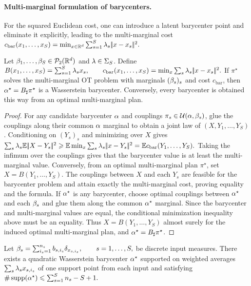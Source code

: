\paragraph{Multi-marginal formulation of barycenters.}
For the squared Euclidean cost, one can introduce a latent barycenter point and eliminate it explicitly, leading to the multi-marginal cost
\(c_{\mathrm{bar}}(x_1,\ldots,x_S) = \min_{x\in\mathbb{R}^d} \sum_{s=1}^S\lambda_s|\!| x-x_s |\!|^2.\)
\begin{prop}\label{prop-multimarginal-barycenter}
Let $\beta_1,\ldots,\beta_S\in\mathcal{P}_2(\mathbb{R}^d)$ and $\lambda\in\Sigma_S$. Define
\(B(x_1,\ldots,x_S)=\sum_{s=1}^S\lambda_s x_s, \qquad c_{\mathrm{bar}}(x_1,\ldots,x_S)=\min_x\sum_s\lambda_s|\!| x-x_s |\!|^2.\)
If $\pi^\star$ solves the multi-marginal OT problem with marginals $(\beta_s)_s$ and cost $c_{\mathrm{bar}}$, then $\alpha^\star=B_\sharp\pi^\star$ is a Wasserstein barycenter. Conversely, every barycenter is obtained this way from an optimal multi-marginal plan.
\end{prop}
\begin{proof}
For any candidate barycenter $\alpha$ and couplings $\pi_s\in\mathcal{U}(\alpha,\beta_s)$, glue the couplings along their common $\alpha$ marginal to obtain a joint law of $(X,Y_1,\ldots,Y_S)$. Conditioning on $(Y_s)_s$ and minimizing over $X$ gives
\(\sum_s\lambda_s\mathbb{E}|\!| X-Y_s |\!|^2 \geqslant \mathbb{E}\min_x\sum_s\lambda_s|\!| x-Y_s |\!|^2 = \mathbb{E} c_{\mathrm{bar}}(Y_1,\ldots,Y_S).\)
Taking the infimum over the couplings gives that the barycenter value is at least the multi-marginal value. Conversely, from an optimal multi-marginal plan $\pi^\star$, set $X=B(Y_1,\ldots,Y_S)$. The couplings between $X$ and each $Y_s$ are feasible for the barycenter problem and attain exactly the multi-marginal cost, proving equality and the formula.
If $\alpha^\star$ is any barycenter, choose optimal couplings between $\alpha^\star$ and each $\beta_s$ and glue them along the common $\alpha^\star$ marginal. Since the barycenter and multi-marginal values are equal, the conditional minimization inequality above must be an equality. Thus $X=B(Y_1,\ldots,Y_S)$ almost surely for the induced optimal multi-marginal plan, and $\alpha^\star=B_\sharp\pi^\star$.
\end{proof}
\begin{cor}\label{cor-discrete-barycenters}
Let
\(\beta_s=\sum_{i_s=1}^{n_s}b_{s,i_s}\delta_{x_{s,i_s}}, \qquad s=1,\ldots,S,\)
be discrete input measures. There exists a quadratic Wasserstein barycenter $\alpha^\star$ supported on weighted averages $\sum_s\lambda_s x_{s,i_s}$ of one support point from each input and satisfying
\(\#\operatorname{supp}(\alpha^\star) \leqslant \sum_{s=1}^S n_s-S+1.\)
\end{cor}
